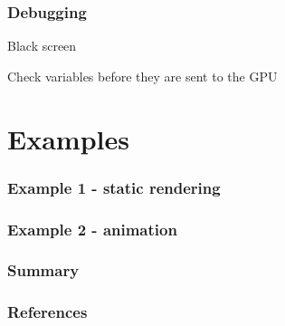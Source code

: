 \documentclass{beamer}
\begin{document}
\begin{frame}
\frametitle{Debugging}
Black screen

Check variables before they are sent to the GPU
\end{frame}


%
%
%
\section{Examples}

\begin{frame}
\frametitle{Example 1 - static rendering}
\end{frame}

\begin{frame}
\frametitle{Example 2 - animation}
\end{frame}

\begin{frame}
\frametitle{Summary}
\end{frame}

\begin{frame}
\frametitle{References}
\end{frame}


\end{document}
